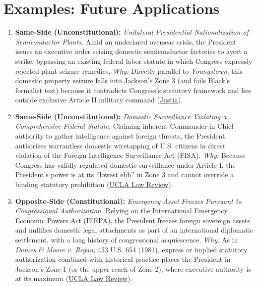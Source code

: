 \documentclass[12pt]{article}
\begin{document}
\section{Examples: Future Applications}
\begin{enumerate}
\item \textbf{Same-Side (Unconstitutional):} \textit{Unilateral Presidential Nationalization of Semiconductor Plants.} Amid an undeclared overseas crisis, the President issues an executive order seizing domestic semiconductor factories to avert a strike, bypassing an existing federal labor statute in which Congress expressly rejected plant-seizure remedies. \textit{Why:} Directly parallel to \textit{Youngstown}, this domestic property seizure falls into Jackson's Zone 3 (and fails Black's formalist test) because it contradicts Congress's statutory framework and lies outside exclusive Article II military command (\href{https://supreme.justia.com/cases/federal/us/343/579/}{Justia}).

\item \textbf{Same-Side (Unconstitutional):} \textit{Domestic Surveillance Violating a Comprehensive Federal Statute.} Claiming inherent Commander-in-Chief authority to gather intelligence against foreign threats, the President authorizes warrantless domestic wiretapping of U.S. citizens in direct violation of the Foreign Intelligence Surveillance Act (FISA). \textit{Why:} Because Congress has validly regulated domestic surveillance under Article I, the President's power is at its ``lowest ebb'' in Zone 3 and cannot override a binding statutory prohibition (\href{https://www.uclalawreview.org/wp-content/uploads/2019/09/44_54UCLALRev1703August2007.pdf}{UCLA Law Review}).

\item \textbf{Opposite-Side (Constitutional):} \textit{Emergency Asset Freezes Pursuant to Congressional Authorization.} Relying on the International Emergency Economic Powers Act (IEEPA), the President freezes foreign sovereign assets and nullifies domestic legal attachments as part of an international diplomatic settlement, with a long history of congressional acquiescence. \textit{Why:} As in \textit{Dames \& Moore v. Regan}, 453 U.S. 654 (1981), express or implied statutory authorization combined with historical practice places the President in Jackson's Zone 1 (or the upper reach of Zone 2), where executive authority is at its maximum (\href{https://www.uclalawreview.org/wp-content/uploads/2019/09/44_54UCLALRev1703August2007.pdf}{UCLA Law Review}).


\end{enumerate}
\end{document}
